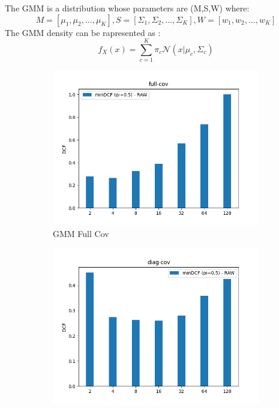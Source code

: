 \documentclass[english]{report}
\begin{document}
The GMM is a distribution whose parameters are (M,S,W) where:
\[M = [\mu_1, \mu_2, ..., \mu_K], S = [\Sigma_1, \Sigma_2, ..., \Sigma_K], 
W = [w_1, w_2, ..., w_K]\]
The GMM density can be rapresented as : 
\[f_X(x) = \sum_{c=1}^{K}\pi_c\mathcal{N} (x|\mu_c,\Sigma_c)\]

\begin{figure}[h!]
    \begin{subfigure}{0.3\textwidth}
        \includegraphics[scale=0.3]{../../images/validation/GMM_full-cov_component_comparison.png}
        \caption{GMM Full Cov}
    \end{subfigure}
    \begin{subfigure}{0.3\textwidth}
        \includegraphics[scale=0.3]{../../images/validation/GMM_diag-cov_component_comparison.png}

\end{subfigure}
\end{figure}
\end{document}
